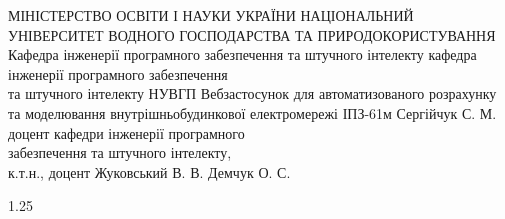 \documentclass[14pt,a4paper]{extarticle}
\begin{document}
    \makepracticetitlepage
    {МІНІСТЕРСТВО ОСВІТИ І НАУКИ УКРАЇНИ}
    {НАЦІОНАЛЬНИЙ УНІВЕРСИТЕТ ВОДНОГО ГОСПОДАРСТВА ТА ПРИРОДОКОРИСТУВАННЯ}
    {Кафедра інженерії програмного забезпечення та штучного інтелекту}
    {кафедра інженерії програмного забезпечення \\ та штучного інтелекту НУВГП}
    {Вебзастосунок для автоматизованого розрахунку та моделювання внутрішньобудинкової електромережі}
    {ІПЗ-61м}
    {Сергійчук С. М.}
    {доцент кафедри інженерії програмного \\ забезпечення та штучного інтелекту, \\ к.т.н., доцент Жуковський В. В.}
    {Демчук О. С.}

    \setcounter{page}{2}
    \pagestyle{fancy}

    

    \clearpage
    \begin{spacing}{1.25}
    \tableofcontents
    \end{spacing}

    
    
    
    
    
\end{document}
